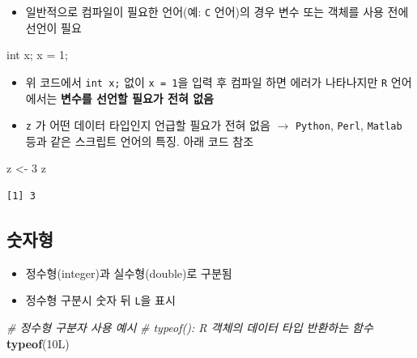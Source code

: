 \documentclass[
  11pt,
]{krantz}
\newenvironment{Shaded}{\begin{snugshade}}{\end{snugshade}}
\newcommand{\CommentTok}[1]{\textcolor[rgb]{0.37,0.37,0.37}{\textit{#1}}}
\newcommand{\DataTypeTok}[1]{\textcolor[rgb]{0.27,0.27,0.27}{#1}}
\newcommand{\DecValTok}[1]{\textcolor[rgb]{0.06,0.06,0.06}{#1}}
\newcommand{\KeywordTok}[1]{\textcolor[rgb]{0.27,0.27,0.27}{\textbf{#1}}}
\newcommand{\NormalTok}[1]{#1}
\newcommand{\StringTok}[1]{\textcolor[rgb]{0.5,0.5,0.5}{#1}}
\providecommand{\tightlist}{%
  \setlength{\itemsep}{0pt}\setlength{\parskip}{0pt}}
\begin{document}
\begin{itemize}
\tightlist
\item
  일반적으로 컴파일이 필요한 언어(예: \texttt{C} 언어)의 경우 변수 또는 객체를 사용 전에 선언이 필요
\end{itemize}

\footnotesize

\begin{Shaded}
\begin{Highlighting}[]
\DataTypeTok{int}\NormalTok{ x; }
\NormalTok{x = }\DecValTok{1}\NormalTok{;}
\end{Highlighting}
\end{Shaded}

\normalsize

\begin{itemize}
\item
  위 코드에서 \texttt{int\ x;} 없이 \texttt{x\ =\ 1}을 입력 후 컴파일 하면 에러가 나타나지만 \texttt{R} 언어에서는 \textbf{변수를 선언할 필요가 전혀 없음}
\item
  \texttt{z} 가 어떤 데이터 타입인지 언급할 필요가 전혀 없음 \(\rightarrow\) \texttt{Python}, \texttt{Perl}, \texttt{Matlab} 등과 같은 스크립트 언어의 특징. 아래 코드 참조
\end{itemize}

\footnotesize

\begin{Shaded}
\begin{Highlighting}[]
\NormalTok{z <-}\StringTok{ }\DecValTok{3}
\NormalTok{z}
\end{Highlighting}
\end{Shaded}

\begin{verbatim}
[1] 3
\end{verbatim}

\normalsize

\hypertarget{numeric}{%
\subsection{숫자형}\label{numeric}}

\begin{itemize}
\tightlist
\item
  정수형(integer)과 실수형(double)로 구분됨
\item
  정수형 구분시 숫자 뒤 \texttt{L}을 표시
\end{itemize}

\footnotesize

\begin{Shaded}
\begin{Highlighting}[]
\CommentTok{# 정수형 구분자 사용 예시}
\CommentTok{# typeof(): R 객체의 데이터 타입 반환하는 함수}
\KeywordTok{typeof}\NormalTok{(10L)}
\end{Highlighting}
\end{Shaded}
\end{document}
